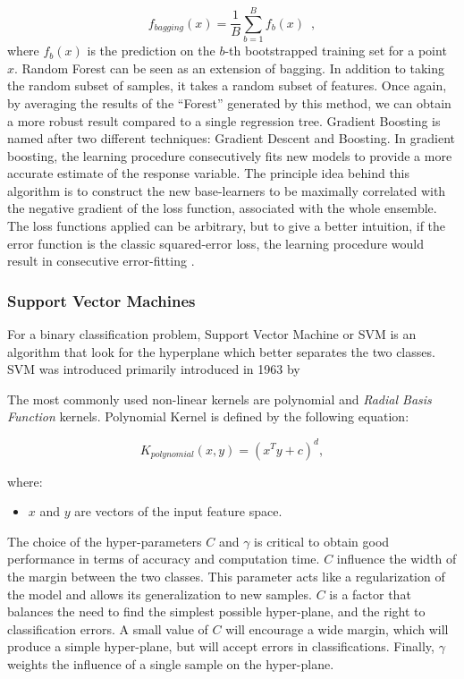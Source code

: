 \begin{equation}
    f_{bagging}(x) = \frac{1}{B}\sum_{b=1}^Bf_b(x)
    \enspace,
\end{equation}
where $f_b(x)$ is the prediction on the $b$-th bootstrapped training set for a point $x$.
Random Forest can be seen as an extension of bagging. In addition to taking the random subset of samples, it takes a random subset of features. Once again, by averaging the results of the “Forest” generated by this method, we can obtain a more robust result compared to a single regression tree. 
Gradient Boosting is named after two different techniques: Gradient Descent and Boosting. In gradient boosting, the learning procedure consecutively fits new models to provide a more accurate estimate of the response variable. The principle idea behind this algorithm is to construct the new base-learners to be maximally correlated with the negative gradient of the loss function, associated with the whole ensemble. The loss functions applied can be arbitrary, but to give a better intuition, if the error function is the classic squared-error loss, the learning procedure would result in consecutive error-fitting \citep{natekin2013gradient}. 

\subsubsection{Support Vector Machines} \label{Support Vector Machines}

For a binary classification problem, Support Vector Machine or SVM is an algorithm that look for the hyperplane which better separates the two classes. SVM was introduced primarily introduced in 1963 by 

The most commonly used non-linear kernels are polynomial and \textit{Radial Basis Function} kernels. Polynomial Kernel is defined by the following equation:

\begin{equation}
    K_{polynomial}(x, y) = (x^{T}y + c)^{d},
\end{equation}

where:

\begin{itemize}
    \item $x$ and $y$ are vectors of the input feature space.
\end{itemize}



The choice of the hyper-parameters $C$ and $\gamma$ is critical to obtain good performance in terms of accuracy and computation time. $C$ inﬂuence the width of the margin between the two classes. This parameter acts like a regularization of the model and allows its generalization to new samples. $C$ is a factor that balances the need to find the simplest possible hyper-plane, and the right to classiﬁcation errors. A small value of $C$ will encourage a wide margin, which will produce a simple hyper-plane, but will accept errors in classiﬁcations. Finally, $\gamma$ weights the inﬂuence of a single sample on the hyper-plane.


